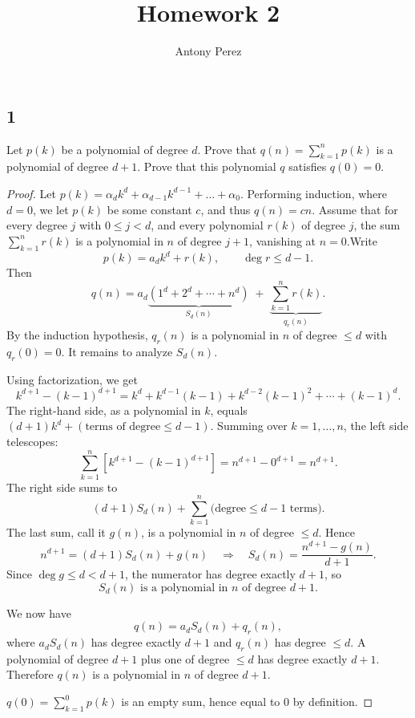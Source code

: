 \documentclass{amsart}
\title{Homework 2}
\author{Antony Perez}
\begin{document}
\maketitle
\subsection*{1} Let $p(k)$ be a polynomial of degree $d$. Prove that $q(n) = \sum_{k=1}^{n} p(k)$ is a polynomial of degree $d +1$. Prove that this polynomial $q$ satisfies $q(0)=0$.
\begin{proof}
   Let $p(k) = \alpha_dk^d + \alpha_{d-1}k^{d-1}+\ldots+\alpha_0$. Performing induction, where $d = 0$, we let $p(k)$ be some constant $c$, and thus $q(n)= cn$. Assume that for every degree
$j$ with $0 \le j < d$, and every polynomial $r(k)$ of degree $j$, the sum
$\sum_{k=1}^{n} r(k)$ is a polynomial in $n$ of degree $j+1$, vanishing at
$n=0$.Write
\[
p(k) = a_d k^d + r(k), \qquad \deg r \le d-1.
\]
Then
\[
q(n) = a_d \underbrace{\left(1^d + 2^d + \cdots + n^d\right)}_{S_d(n)}
       \;+\; \underbrace{\sum_{k=1}^{n} r(k)}_{q_r(n)}.
\]
By the induction hypothesis, $q_r(n)$ is a
polynomial in $n$ of degree $\le d$ with $q_r(0) = 0$. It remains to
analyze $S_d(n)$.
 
\medskip
\noindent Using factorization, we get
\[
k^{d+1} - (k-1)^{d+1}
= k^d + k^{d-1}(k-1) + k^{d-2}(k-1)^2 + \cdots + (k-1)^d.
\]
The right-hand side, as a polynomial in $k$, equals
$(d+1)k^d + (\text{terms of degree} \le d-1)$.
Summing over
$k = 1, \dots, n$, the left side telescopes:
\[
\sum_{k=1}^{n} \left[k^{d+1} - (k-1)^{d+1}\right] = n^{d+1} - 0^{d+1} = n^{d+1}.
\]
The right side sums to
\[
(d+1) S_d(n) + \sum_{k=1}^{n} \big(\text{degree} \le d-1 \text{ terms}\big).
\]
The last sum, call it $g(n)$, is a
polynomial in $n$ of degree $\le d$. Hence
\[
n^{d+1} = (d+1) S_d(n) + g(n)
\quad\Longrightarrow\quad
S_d(n) = \frac{n^{d+1} - g(n)}{d+1}.
\]
Since $\deg g \le d < d+1$, the numerator has degree exactly $d+1$, so
\[
S_d(n) \text{ is a polynomial in } n \text{ of degree } d+1.
\]
 
\medskip
\noindent We now have
\[
q(n) = a_d S_d(n) + q_r(n),
\]
where $a_d S_d(n)$ has degree exactly $d+1$ and $q_r(n)$ has degree $\le d$. A polynomial
of degree $d+1$ plus one of degree $\le d$ has degree exactly $d+1$.
Therefore $q(n)$ is a polynomial in $n$ of degree $d+1$.

 
\medskip
$q(0) =
\sum_{k=1}^{0} p(k)$ is an empty sum, hence equal to $0$ by definition.
\end{proof}
\end{document}
